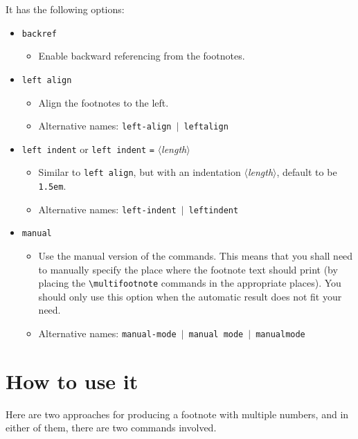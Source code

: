 \documentclass[classical]{einfart}
\newcommand{\meta}[1]{$\langle${\normalfont\itshape#1}$\rangle$}
\newcommand{\packageoption}[1]{\textcolor{code-option}{\texttt{#1}}}
\begin{document}
\medskip
It has the following options:
\begin{itemize}[label=,leftmargin=1.25em,itemindent=-1.25em]
    \item \packageoption{backref}
        \begin{itemize}
            \item Enable backward referencing from the footnotes.
        \end{itemize}
    \item \packageoption{left align}
        \begin{itemize}
            \item Align the footnotes to the left.
            \item Alternative names: \packageoption{left-align} \,$|$\, \packageoption{leftalign}
        \end{itemize}
    \item \packageoption{left indent} or \packageoption{left indent} \lstinline|=| \meta{length}
        \begin{itemize}
            \item Similar to \packageoption{left align}, but with an indentation \meta{length}, default to be \texttt{1.5em}.
            \item Alternative names: \packageoption{left-indent} \,$|$\, \packageoption{leftindent}
        \end{itemize}
    \item \packageoption{manual}
        \begin{itemize}
            \item Use the manual version of the commands. This means that you shall need to manually specify the place where the footnote text should print (by placing the \lstinline|\multifootnote| commands in the appropriate places). You should only use this option when the automatic result does not fit your need.
            \item Alternative names: \packageoption{manual-mode} \,$|$\, \packageoption{manual mode} \,$|$\, \packageoption{manualmode}
        \end{itemize}
\end{itemize}

\clearpage
\section{How to use it}

Here are two approaches for producing a footnote with multiple numbers, and in either of them, there are two commands involved.
\end{document}
